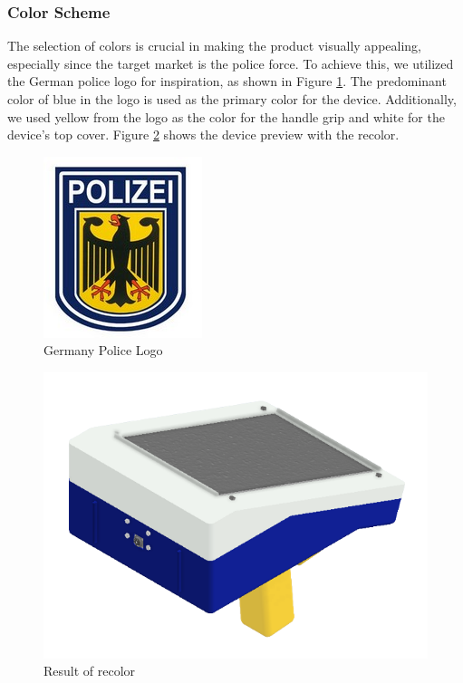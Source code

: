 \subsubsection{Color Scheme}
The selection of colors is crucial in making the product visually appealing, especially since the target market is the police force. To achieve this, we utilized the German police logo for inspiration, as shown in Figure \ref{fig:polizei_logo}. The predominant color of blue in the logo is used as the primary color for the device. Additionally, we used yellow from the logo as the color for the handle grip and white for the device's top cover. Figure \ref{fig:color_scheme} shows the device preview with the recolor.

\begin{figure}[ht!]
    \centering
    \includegraphics[height=5 cm]{texs/Part1/chapter4/image/polizei.jpg}
    \caption{Germany Police Logo \cite{bundespolizei}}
    \label{fig:polizei_logo}
\end{figure}

\begin{figure}[ht!]
    \centering
    \includegraphics[height=9 cm]{texs/Part1/chapter4/image/d41.png}
    \caption{Result of recolor}
    \label{fig:color_scheme}
\end{figure}



